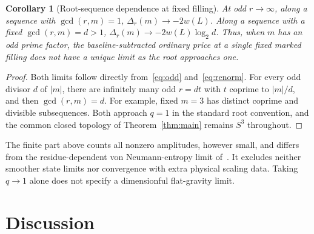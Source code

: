 \documentclass[11pt]{article}
\newtheorem{corollary}[theorem]{Corollary}
\theoremstyle{remark}
\begin{document}
\begin{corollary}[Root-sequence dependence at fixed filling]
At odd \(r\to\infty\), along a sequence with \(\gcd(r,m)=1\),
\(\Delta_r(m)\to-2w(L)\). Along a sequence with a fixed \(\gcd(r,m)=d>1\),
\(\Delta_r(m)\to-2w(L)\log_2 d\). Thus, when \(m\) has an odd prime factor, the baseline-subtracted ordinary price at a single fixed marked filling does not have a unique limit as the root approaches one.
\end{corollary}
\begin{proof}
Both limits follow directly from~\eqref{eq:odd} and~\eqref{eq:renorm}. For every odd divisor \(d\) of \(|m|\), there are infinitely many odd \(r=d t\) with \(t\) coprime to \(|m|/d\), and then \(\gcd(r,m)=d\). For example, fixed \(m=3\) has distinct coprime and divisible subsequences. Both approach \(q=1\) in the standard root convention, and the common closed topology of Theorem~\ref{thm:main} remains \(S^3\) throughout.
\end{proof}

The finite part above counts all nonzero amplitudes, however small, and differs from the residue-dependent von Neumann-entropy limit of~\cite{Residue}. It excludes neither smoother state limits nor convergence with extra physical scaling data. Taking \(q\to1\) alone does not specify a dimensionful flat-gravity limit.

\section{Discussion}
\end{document}
